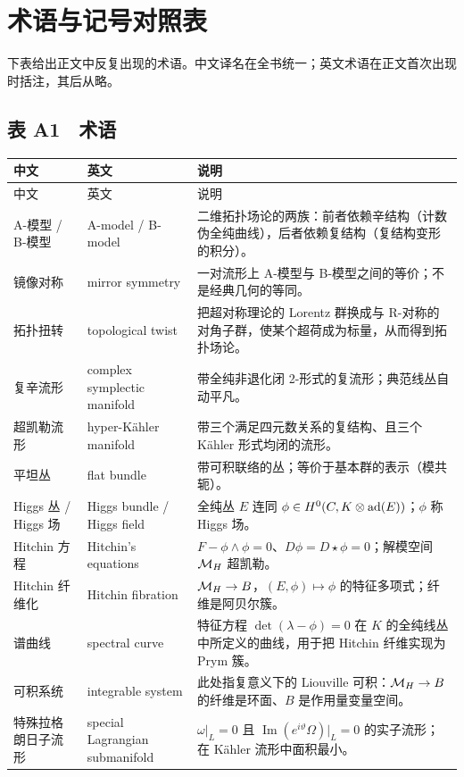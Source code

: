 \section{术语与记号对照表}

下表给出正文中反复出现的术语。中文译名在全书统一；英文术语在正文首次出现时括注，其后从略。

\subsection*{表 A1　术语}
\begin{longtable}{p{}p{}p{}}
\toprule 中文 & 英文 & 说明 \\ \midrule \endfirsthead
\toprule 中文 & 英文 & 说明 \\ \midrule \endhead
\bottomrule \endfoot
A-模型 / B-模型 & A-model / B-model & 二维拓扑场论的两族：前者依赖辛结构（计数伪全纯曲线），后者依赖复结构（复结构变形的积分）。 \\
镜像对称 & mirror symmetry & 一对流形上 A-模型与 B-模型之间的等价；不是经典几何的等同。 \\
拓扑扭转 & topological twist & 把超对称理论的 Lorentz 群换成与 R-对称的对角子群，使某个超荷成为标量，从而得到拓扑场论。 \\
复辛流形 & complex symplectic manifold & 带全纯非退化闭 2-形式的复流形；典范线丛自动平凡。 \\
超凯勒流形 & hyper-Kähler manifold & 带三个满足四元数关系的复结构、且三个 Kähler 形式均闭的流形。 \\
平坦丛 & flat bundle & 带可积联络的丛；等价于基本群的表示（模共轭）。 \\
Higgs 丛 / Higgs 场 & Higgs bundle / Higgs field & 全纯丛 $E$ 连同 $\phi\in H^{0}(C,K\otimes\operatorname{ad}(E))$；$\phi$ 称 Higgs 场。 \\
Hitchin 方程 & Hitchin's equations & $F-\phi\wedge\phi=0$、$D\phi=D\star\phi=0$；解模空间 $\mathcal{M}_{H}$ 超凯勒。 \\
Hitchin 纤维化 & Hitchin fibration & $\mathcal{M}_{H}\to B$，$(E,\phi)\mapsto\phi$ 的特征多项式；纤维是阿贝尔簇。 \\
谱曲线 & spectral curve & 特征方程 $\det(\lambda-\phi)=0$ 在 $K$ 的全纯线丛中所定义的曲线，用于把 Hitchin 纤维实现为 Prym 簇。 \\
可积系统 & integrable system & 此处指复意义下的 Liouville 可积：$\mathcal{M}_{H}\to B$ 的纤维是环面、$B$ 是作用量变量空间。 \\
特殊拉格朗日子流形 & special Lagrangian submanifold & $\omega|_L=0$ 且 $\operatorname{Im}(e^{i\vartheta}\Omega)|_L=0$ 的实子流形；在 Kähler 流形中面积最小。 \\

\end{longtable}
